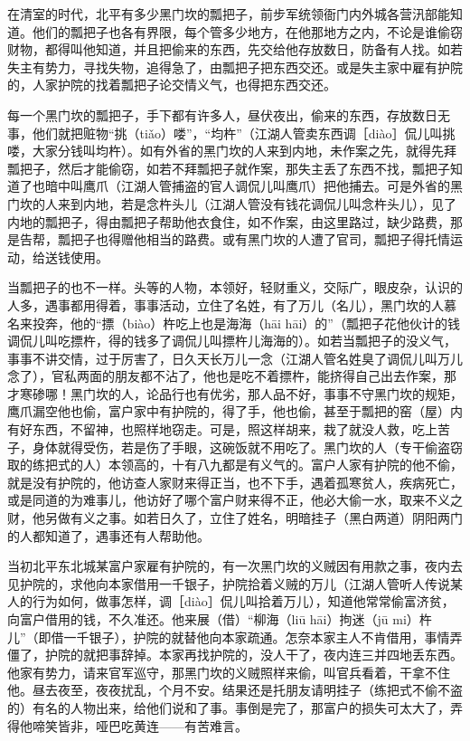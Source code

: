 \documentclass[12pt,UTF8]{ctexbook}
\begin{document}
在清室的时代，北平有多少黑门坎的瓢把子，前步军统领衙门内外城各营汛部能知道。他们的瓢把子也各有界限，每个管多少地方，在他那地方之内，不论是谁偷窃财物，都得叫他知道，并且把偷来的东西，先交给他存放数日，防备有人找。如若失主有势力，寻找失物，追得急了，由瓢把子把东西交还。或是失主家中雇有护院的，人家护院的找着瓢把子论交情义气，也得把东西交还。

每一个黑门坎的瓢把子，手下都有许多人，昼伏夜出，偷来的东西，存放数日无事，他们就把赃物“挑（tiǎo）喽”，“均杵”（江湖人管卖东西调［diào］侃儿叫挑喽，大家分钱叫均杵）。如有外省的黑门坎的人来到内地，未作案之先，就得先拜瓢把子，然后才能偷窃，如若不拜瓢把子就作案，那失主丢了东西不找，瓢把子知道了也暗中叫鹰爪（江湖人管捕盗的官人调侃儿叫鹰爪）把他捕去。可是外省的黑门坎的人来到内地，若是念杵头儿（江湖人管没有钱花调侃儿叫念杵头儿），见了内地的瓢把子，得由瓢把子帮助他衣食住，如不作案，由这里路过，缺少路费，那是告帮，瓢把子也得赠他相当的路费。或有黑门坎的人遭了官司，瓢把子得托情运动，给送钱使用。

当瓢把子的也不一样。头等的人物，本领好，轻财重义，交际广，眼皮杂，认识的人多，遇事都用得着，事事活动，立住了名姓，有了万儿（名儿），黑门坎的人慕名来投奔，他的“摽（biào）杵吃上也是海海（hāi hāi）的”（瓢把子花他伙计的钱调侃儿叫吃摽杵，得的钱多了调侃儿叫摽杵儿海海的）。如若当瓢把子的没义气，事事不讲交情，过于厉害了，日久天长万儿一念（江湖人管名姓臭了调侃儿叫万儿念了），官私两面的朋友都不沾了，他也是吃不着摽杵，能挤得自己出去作案，那才寒碜哪！黑门坎的人，论品行也有优劣，那人品不好，事事不守黑门坎的规矩，鹰爪漏空他也偷，富户家中有护院的，得了手，他也偷，甚至于瓢把的窑（屋）内有好东西，不留神，也照样地窃走。可是，照这样胡来，栽了就没人救，吃上苦子，身体就得受伤，若是伤了手眼，这碗饭就不用吃了。黑门坎的人（专干偷盗窃取的练把式的人）本领高的，十有八九都是有义气的。富户人家有护院的他不偷，就是没有护院的，他访查人家财来得正当，也不下手，遇着孤寒贫人，疾病死亡，或是同道的为难事儿，他访好了哪个富户财来得不正，他必大偷一水，取来不义之财，他另做有义之事。如若日久了，立住了姓名，明暗挂子（黑白两道）阴阳两门的人都知道了，遇事还有人帮助他。

当初北平东北城某富户家雇有护院的，有一次黑门坎的义贼因有用款之事，夜内去见护院的，求他向本家借用一千银子，护院拾着义贼的万儿（江湖人管听人传说某人的行为如何，做事怎样，调［diào］侃儿叫拾着万儿），知道他常常偷富济贫，向富户借用的钱，不久准还。他来展（借）“柳海（liū hāi）拘迷（jū mi）杵儿”（即借一千银子），护院的就替他向本家疏通。怎奈本家主人不肯借用，事情弄僵了，护院的就把事辞掉。本家再找护院的，没人干了，夜内连三并四地丢东西。他家有势力，请来官军巡守，那黑门坎的义贼照样来偷，叫官兵看着，干拿不住他。昼去夜至，夜夜扰乱，个月不安。结果还是托朋友请明挂子（练把式不偷不盗的）有名的人物出来，给他们说和了事。事倒是完了，那富户的损失可太大了，弄得他啼笑皆非，哑巴吃黄连——有苦难言。
\end{document}
